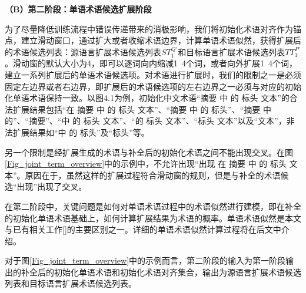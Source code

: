 \textbf{（B）第二阶段：单语术语候选扩展阶段}

为了尽量降低训练流程中错误传递带来的消极影响，我们将初始化术语对齐作为锚点，建立滑动窗口，通过扩大或者收缩术语边界，计算单语术语似然，获得扩展后的术语候选列表：源语言扩展术语候选列表$ST_1^{Q'}$和目标语言扩展术语候选列表$TT_1^{P'}$。滑动窗的默认大小为4，即可以逐词向内缩减1~4个词，或者向外扩展1~4个词，建立一系列扩展后的单语术语候选项。对术语进行扩展时，我们的限制之一是必须固定左边界或者右边界，即扩展后的术语候选项的左右边界之一必须与对应的初始化单语术语保持一致。以图4.1为例，初始化中文术语“摘要 中 的 标头 文本”的合法扩展结果包括“在 摘要 中 的 标头 文本”、“摘要 中 的 标头”、“摘要 中 的”、“摘要”、“中 的 标头 文本”、“的 标头 文本”、“标头 文本”以及“文本”，非法扩展结果如“中 的 标头”及“标头”等。

另一个限制是经扩展生成的术语与补全后的初始化术语之间不能出现交叉。在图\ref{Fig_joint_term_overview}中的示例中，不允许出现“出现 在 摘要 中 的 标头 文本”。原因在于，虽然这样的扩展过程符合滑动窗的规则，但是与补全的术语候选“出现”出现了交叉。

在第二阶段中，关键问题是如何对单语术语过程中的术语似然进行建模，即在补全的初始化单语术语基础上，如何计算扩展结果为术语的概率。单语术语似然是本文与已有相关工作[\cite{Chen:2010,Chen:2012}]的主要区别之一。详细的单语术语似然计算过程将在后文中介绍。

对于图\ref{Fig_joint_term_overview}中的示例而言，第二阶段的输入为第一阶段输出的补全后的初始化单语术语和初始化术语对齐集合，输出为源语言扩展术语候选列表和目标语言扩展术语候选列表。

